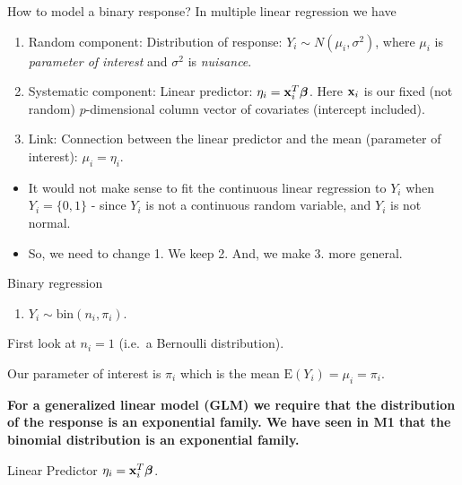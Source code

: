 \documentclass[
  ignorenonframetext,
]{beamer}
\providecommand{\tightlist}{%
  \setlength{\itemsep}{0pt}\setlength{\parskip}{0pt}}
\begin{document}
\begin{frame}{How to model a binary response?}
\label{how-to-model-a-binary-response}
In multiple linear regression we have

\begin{enumerate}
\item
  Random component: Distribution of response:
  \(Y_i\sim N(\mu_i,\sigma^2)\), where \(\mu_i\) is \emph{parameter of
  interest} and \(\sigma^2\) is \emph{nuisance}.
\item
  Systematic component: Linear predictor:
  \(\eta_i={\bf x}_i^T \boldsymbol{\beta}\). Here \({\bf x}_i\) is our
  fixed (not random) \(p\)-dimensional column vector of covariates
  (intercept included).
\item
  Link: Connection between the linear predictor and the mean (parameter
  of interest): \(\mu_i=\eta_i\).
\end{enumerate}

\begin{itemize}
\tightlist
\item
  It would not make sense to fit the continuous linear regression to
  \(Y_i\) when \(Y_i=\{0,1\}\) - since \(Y_i\) is not a continuous
  random variable, and \(Y_i\) is not normal.
\item
  So, we need to change 1. We keep 2. And, we make 3. more general.
\end{itemize}
\end{frame}

\begin{frame}
\begin{block}{Binary regression}
\label{binary-regression}
\begin{enumerate}
\tightlist
\item
  \(Y_i \sim \text{bin}(n_i,\pi_i)\).
\end{enumerate}

First look at \(n_i=1\) (i.e.~a Bernoulli distribution).

Our parameter of interest is \(\pi_i\) which is the mean
\(\text{E}(Y_i)=\mu_i=\pi_i\).

\textbf{For a generalized linear model (GLM) we require that the
distribution of the response is an exponential family. We have seen in
M1 that the binomial distribution is an exponential family.}
\end{block}
\end{frame}

\begin{frame}
\begin{block}{Linear Predictor}
\label{linear-predictor}
\(\eta_i={\bf x}_i^T \boldsymbol{\beta}\).
\end{block}
\end{frame}
\end{document}
